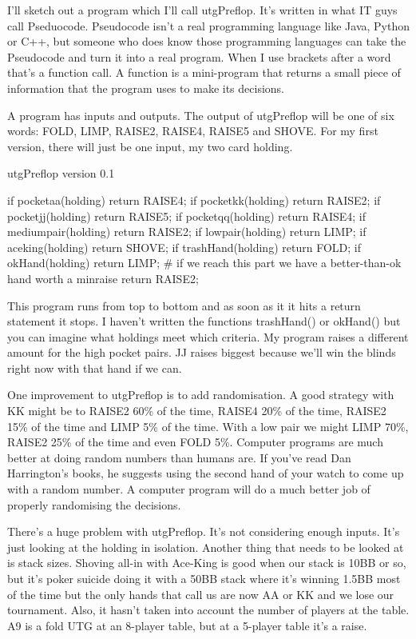 I'll sketch out a program which I'll call utgPreflop. It's written
in what IT guys call Pseduocode. Pseudocode isn't a real programming
language like Java, Python or C++, but someone who does know those
programming languages can take the Pseudocode and turn it into a real
program. When I use brackets after a word that's a function call.
A function is a mini-program that returns a small piece of information
that the program uses to make its decisions.

A program has inputs and outputs. The output of utgPreflop will
be one of six words: FOLD, LIMP, RAISE2, RAISE4, RAISE5 and SHOVE.
For my first version, there will just be one input, my two card
holding.

utgPreflop version 0.1


if pocketaa(holding) return RAISE4;
if pocketkk(holding) return RAISE2;
if pocketjj(holding) return RAISE5;
if pocketqq(holding) return RAISE4;
if mediumpair(holding) return RAISE2;
if lowpair(holding) return LIMP;
if aceking(holding) return SHOVE;
if trashHand(holding) return FOLD;
if okHand(holding) return LIMP;
\# if we reach this part we have a better-than-ok hand worth a minraise
return RAISE2;

This program runs from top to bottom and as soon as it it hits a
return statement it stops. I haven't written the functions
trashHand() or okHand() but you can imagine what holdings
meet which criteria. My program raises a different amount
for the high pocket pairs. JJ raises biggest because we'll win the
blinds right now with that hand if we can.

One improvement to utgPreflop is to add randomisation. A good strategy
with KK might be to RAISE2 60\% of the time, RAISE4 20\% of the time,
RAISE2 15\% of the time and LIMP 5\% of the time. With a low pair we
might LIMP 70\%, RAISE2 25\% of the time and even FOLD 5\%. Computer
programs are much better at doing random numbers than humans are. If
you've read Dan Harrington's books, he suggests using the second hand
of your watch to come up with a random number. A computer program will
do a much better job of properly randomising the decisions.

There's a huge problem with utgPreflop. It's not considering enough
inputs. It's just looking at the holding in isolation. Another thing
that needs to be looked at is stack sizes. Shoving all-in with
Ace-King is good when our stack is 10BB or so, but it's poker suicide
doing it with a 50BB stack where it's winning 1.5BB most of the
time but the only hands that call us are now AA or KK and we lose our
tournament. Also, it hasn't taken into account the number of players
at the table. A9 is a fold UTG at an 8-player table, but at a 5-player
table it's a raise.

